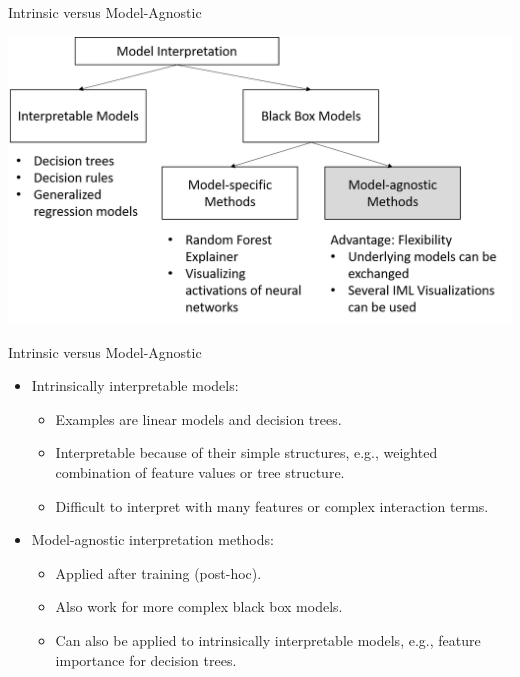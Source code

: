 \documentclass[11pt,compress,t,notes=noshow, aspectratio=169, xcolor=table]{beamer}
\begin{document}
\begin{vbframe}{Intrinsic versus Model-Agnostic}
	\begin{center}
		\includegraphics[width=\textwidth]{figure/overview}
	\end{center}
\end{vbframe}


\begin{vbframe}{Intrinsic versus Model-Agnostic}
	\begin{itemize}
		\item Intrinsically interpretable models:
		\begin{itemize}
			\item Examples are linear models and decision trees.
			\item Interpretable because of their simple structures, e.g., weighted combination of feature values or tree structure. 
			\item Difficult to interpret with many features or complex interaction terms.
		\end{itemize}
	\bigskip
	
		\item Model-agnostic interpretation methods:
		\begin{itemize}
			\item Applied after training (post-hoc).
			\item Also work for more complex black box models.
			\item Can also be applied to intrinsically interpretable models, e.g., feature importance for decision trees. 
		\end{itemize}
	\end{itemize}
\end{vbframe}
\end{document}
